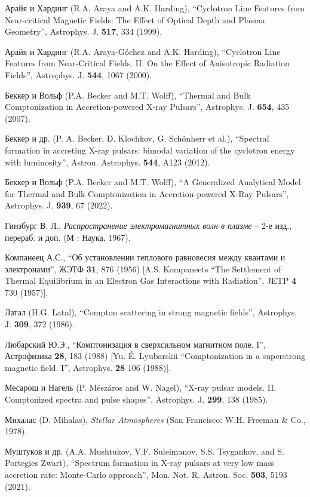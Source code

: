 \documentclass{pazh2col-win}
\begin{document}
\begin{references}

Арайя и Хардинг (R.A. Araya and A.K. Harding), ``Cyclotron Line Features from Near-critical Magnetic Fields: The Effect of Optical Depth and Plasma Geometry'', Astrophys. J. {\bf 517}, 334 (1999).

Арайя и Хардинг (R.A. Araya-G\'ochez and A.K. Harding), ``Cyclotron Line Features from Near-Critical Fields. II. On the Effect of Anisotropic Radiation Fields'', Astrophys. J. {\bf 544}, 1067 (2000).

Беккер и Вольф (P.A. Becker and M.T. Wolff), ``Thermal and Bulk Comptonization in Accretion-powered X-ray Pulsars'', Astrophys. J. {\bf 654}, 435 (2007).

Беккер и др. (P. A. Becker, D. Klochkov, G. Sch\"onherr et al.), ``Spectral formation in accreting X-ray pulsars: bimodal variation of the cyclotron energy with luminosity'', Astron. Astrophys. {\bf 544}, A123 (2012).

Беккер и Вольф (P.A. Becker and M.T. Wolff), ``A Generalized Analytical Model for Thermal and Bulk Comptonization in Accretion-powered X-Ray Pulsars'', Astrophys. J. {\bf 939}, 67 (2022).

Гинзбург В. Л., {\it Распространение электромагнитных волн в плазме} – 2-е изд., перераб. и доп. (М : Наука, 1967).

Компанеец А.С., ``Об установлении теплового равновесия между квантами и электронами'', ЖЭТФ {\bf 31}, 876 (1956) [A.S. Kompaneets ``The Settlement of Thermal Equilibrium in an Electron Gas Interactions with Radiation'', JETP {\bf 4} 730 (1957)].

Латал (H.G. Latal), ``Compton scattering in strong magnetic fields'', Astrophys. J. {\bf 309}, 372 (1986).

Любарский Ю.Э., ``Комптонизация в сверхсильном магнитном поле. I'', Астрофизика {\bf 28}, 183 (1988) [Yu. \'E. Lyubarskii ``Comptonization in a superstrong magnetic field. I'', Astrophys. {\bf 28} 106 (1988)].

Месарош и Нагель (P. M\'esz\'aros and W. Nagel), ``X-ray pulsar models. II. Comptonized spectra and pulse shapes'', Astrophys. J. {\bf 299}, 138 (1985).

Михалас (D. Mihalas), {\it Stellar Atmospheres} (San Francisco: W.H. Freeman \& Co., 1978).

Муштуков и др. (A.A. Mushtukov, V.F. Suleimanov, S.S. Tsygankov, and S. Portegies Zwart), ``Spectrum formation in X-ray pulsars at very low mass accretion rate: Monte-Carlo approach'', Mon. Not. R. Astron. Soc. {\bf 503}, 5193 (2021).


\end{references}
\end{document}
